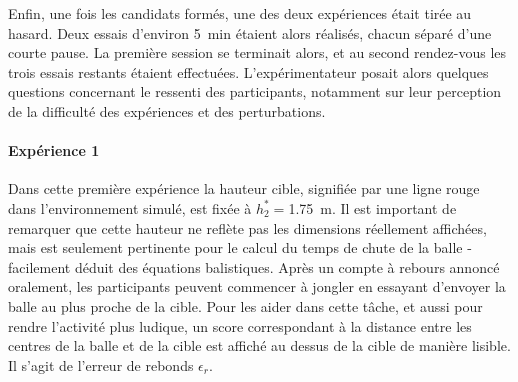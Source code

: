 
Enfin, une fois les candidats formés, une des deux expériences était tirée au hasard. %
Deux essais d'environ \SI{5}{\minute} étaient alors réalisés, chacun séparé d'une courte pause. %
La première session se terminait alors, et au second rendez-vous les trois essais restants étaient effectuées. L'expérimentateur posait alors quelques questions concernant le ressenti des participants, notamment sur leur perception de la difficulté des expériences et des perturbations.

\paragraph{Expérience 1} 

Dans cette première expérience la hauteur cible, signifiée par une ligne rouge dans l'environnement simulé, est fixée à $h_2^*=$\SI{1.75}{\meter}. Il est important de remarquer que cette hauteur ne reflète pas les dimensions réellement affichées, mais est seulement pertinente pour le calcul du temps de chute de la balle - facilement déduit des équations balistiques. Après un compte à rebours annoncé oralement, les participants peuvent commencer à jongler en essayant d'envoyer la balle au plus proche de la cible. Pour les aider dans cette tâche, et aussi pour rendre l'activité plus ludique, un score correspondant à la distance entre les centres de la balle et de la cible est affiché au dessus de la cible de manière lisible. Il s'agit de l'erreur de rebonds $\epsilon_r$.

